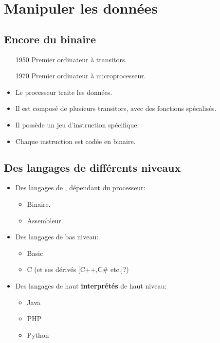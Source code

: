 \section{Manipuler les données}
\subsection{Encore du binaire}

\begin{frame}
	\begin{itemize}
		\item[1950] Premier ordinateur à transitors.
		\item[1970] Premier ordinateur à microprocesseur. %
	\end{itemize}
\end{frame}

\begin{frame}
	\begin{itemize}
		\item Le processeur traite les données.
		\item Il est composé de plusieurs transitors, avec des fonctions spécalisés.
		\item Il possède un jeu d'instruction spécifique.
		\item Chaque instruction est codée en binaire.
	\end{itemize}
\end{frame}

\subsection{Des langages de différents niveaux}

\begin{frame}
	\begin{itemize}
		\item Des langages de , dépendant du processeur:
		\begin{itemize}
			\item Binaire.
			\item Assembleur.
		\end{itemize}
		\item Des langages  de bas niveau:
		\begin{itemize}
			\item Basic
			\item C (et ses dérivés [C++,C\# etc.]?)
		\end{itemize}
		\item Des langages de haut \textbf{interprétés} de haut niveau:
		\begin{itemize}
			\item Java
			\item PHP
			\item Python
		\end{itemize}
	\end{itemize}
\end{frame}

